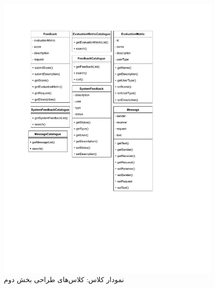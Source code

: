 \begin{figure}[ht!]
	\centering
	\includegraphics[scale=0.8]{figs/OOD-class-page-2.pdf}
	\caption{نمودار کلاس: کلاس‌های طراحی بخش دوم}
\end{figure}
\FloatBarrier
\newpage

